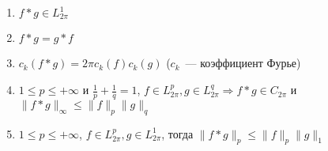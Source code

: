 \begin{properties}
    \leavevmode
    \begin{enumerate}
        \item $f \ast g \in L^1_{2\pi}$
        \item $f \ast g = g \ast f$
        \item $c_k(f\ast g) = 2\pi c_k(f) c_k(g)$ ($c_k$~--- коэффициент Фурье)
        \item $1 \leq p \leq +\infty$ и $\frac{1}{p} + \frac{1}{q} = 1$, $f \in L^p_{2\pi}, g \in L^q_{2\pi} \Rightarrow f \ast g \in C_{2\pi}$ и $\|f \ast g\|_\infty \leq \|f\|_p\|g\|_q$
        \item $1 \leq p \leq +\infty$, $f \in L^p_{2\pi}, g \in L^1_{2\pi}$, тогда $\|f \ast g\|_p \leq \|f\|_p \|g\|_1$
    \end{enumerate}
\end{properties}

